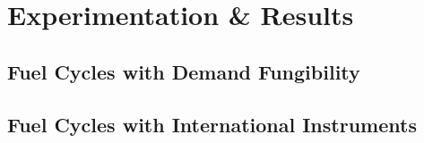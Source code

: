 \section{Experimentation \& Results}\label{results}

\subsection{Fuel Cycles with Demand Fungibility}





\subsection{Fuel Cycles with International Instruments}




